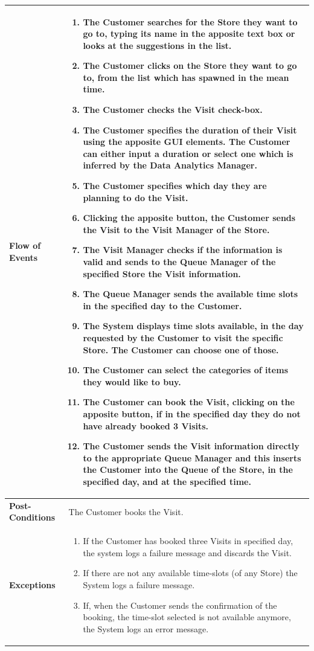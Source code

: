 \documentclass[a4paper, 12pt, oneside]{article}
\begin{document}
\begin{tabularx}{\linewidth}{| l | X |}
    \hline
    \textbf{Flow of Events} & \parbox{0.7\textwidth}{   
        \begin{enumerate}
            \item The Customer searches for the Store they want to go to, typing its name in the apposite text box or looks at the suggestions in the list.
            \item The Customer clicks on the Store they want to go to, from the list which has spawned in the mean time.
            \item The Customer checks the Visit check-box.
            \item The Customer specifies the duration of their Visit using the apposite GUI elements. The Customer can either input a duration or select one which is inferred by the Data Analytics Manager.
            \item The Customer specifies which day they are planning to do the Visit.
            \item Clicking the apposite button, the Customer sends the Visit to the Visit Manager of the Store.
            \item The Visit Manager checks if the information is valid and sends to the Queue Manager of the specified Store the Visit information.
            \item The Queue Manager sends the available time slots in the specified day to the Customer.
            \item The System displays time slots available, in the day requested by the Customer to visit the specific Store. The Customer can choose one of those.
            \item The Customer can select the categories of items they would like to buy.
            \item The Customer can book the Visit, clicking on the apposite button, if in the specified day they do not have already booked 3 Visits.
            \item The Customer sends the Visit information directly to the appropriate Queue Manager and this inserts the Customer into the Queue of the Store, in the specified day, and at the specified time.
    \end{enumerate}}\\
    
    \hline
    \textbf{Post-Conditions} & The Customer books the Visit.\\
    
    \hline
    \textbf{Exceptions} & \parbox{0.7\textwidth}{ \begin{enumerate}
            \item If the Customer has booked three Visits in specified day, the system logs a failure message and discards the Visit.
            \item If there are not any available time-slots (of any Store) the System logs a failure message.
            \item If, when the Customer sends the confirmation of the booking, the time-slot selected is not available anymore, the System logs an error message.
        \end{enumerate}}\\


\end{tabularx}
\end{document}
